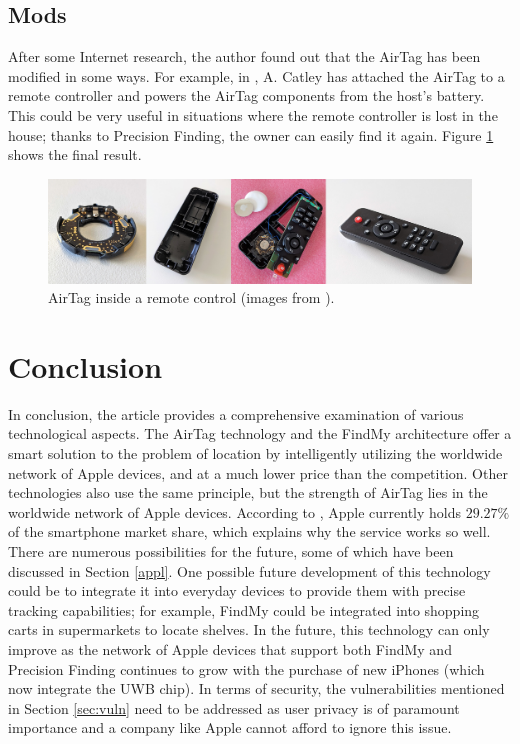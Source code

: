 \documentclass[english]{article}
\begin{document}
\subsection{Mods}
After some Internet research, the author found out that the AirTag has been modified in some ways. For example, in \cite{telecomando}, A. Catley has attached the AirTag to a remote controller and powers the AirTag components from the host's battery. This could be very useful in situations where the remote controller is lost in the house; thanks to Precision Finding, the owner can easily find it again. Figure \ref{img:controller} shows the final result.
\begin{figure}[]
	\centering
	\includegraphics[width=\textwidth]{images/remote.jpg}
	\caption{AirTag inside a remote control (images from \cite{reverse}).}
	\label{img:controller}
\end{figure}


\section{Conclusion}
In conclusion, the article provides a comprehensive examination of various technological aspects. The AirTag technology and the FindMy architecture offer a smart solution to the problem of location by intelligently utilizing the worldwide network of Apple devices, and at a much lower price than the competition. Other technologies also use the same principle, but the strength of AirTag lies in the worldwide network of Apple devices. According to \cite{Lin}, Apple currently holds $29.27\%$ of the smartphone market share, which explains why the service works so well. There are numerous possibilities for the future, some of which have been discussed in Section \ref{appl}. One possible future development of this technology could be to integrate it into everyday devices to provide them with precise tracking capabilities; for example, FindMy could be integrated into shopping carts in supermarkets to locate shelves. In the future, this technology can only improve as the network of Apple devices that support both FindMy and Precision Finding continues to grow with the purchase of new iPhones (which now integrate the UWB chip). In terms of security, the vulnerabilities mentioned in Section \ref{sec:vuln} need to be addressed as user privacy is of paramount importance and a company like Apple cannot afford to ignore this issue.
\printbibliography
\nocite{*}
\end{document}
